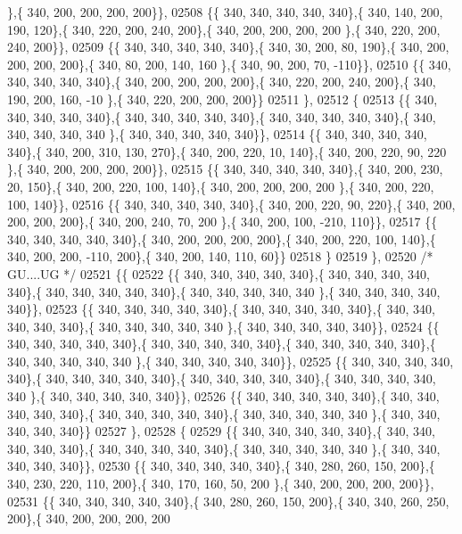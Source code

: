 \begin{DoxyCode}
      \},\{ 340, 200, 200, 200, 200\}\},
02508 \{\{ 340, 340, 340, 340, 340\},\{ 340, 140, 200, 190, 120\},\{ 340, 220, 200, 240, 200\},\{ 340, 200, 200, 200, 200
      \},\{ 340, 220, 200, 240, 200\}\},
02509 \{\{ 340, 340, 340, 340, 340\},\{ 340,  30, 200,  80, 190\},\{ 340, 200, 200, 200, 200\},\{ 340,  80, 200, 140, 160
      \},\{ 340,  90, 200,  70, -110\}\},
02510 \{\{ 340, 340, 340, 340, 340\},\{ 340, 200, 200, 200, 200\},\{ 340, 220, 200, 240, 200\},\{ 340, 190, 200, 160, -10
      \},\{ 340, 220, 200, 200, 200\}\}
02511 \},
02512 \{
02513 \{\{ 340, 340, 340, 340, 340\},\{ 340, 340, 340, 340, 340\},\{ 340, 340, 340, 340, 340\},\{ 340, 340, 340, 340, 340
      \},\{ 340, 340, 340, 340, 340\}\},
02514 \{\{ 340, 340, 340, 340, 340\},\{ 340, 200, 310, 130, 270\},\{ 340, 200, 220,  10, 140\},\{ 340, 200, 220,  90, 220
      \},\{ 340, 200, 200, 200, 200\}\},
02515 \{\{ 340, 340, 340, 340, 340\},\{ 340, 200, 230,  20, 150\},\{ 340, 200, 220, 100, 140\},\{ 340, 200, 200, 200, 200
      \},\{ 340, 200, 220, 100, 140\}\},
02516 \{\{ 340, 340, 340, 340, 340\},\{ 340, 200, 220,  90, 220\},\{ 340, 200, 200, 200, 200\},\{ 340, 200, 240,  70, 200
      \},\{ 340, 200, 100, -210, 110\}\},
02517 \{\{ 340, 340, 340, 340, 340\},\{ 340, 200, 200, 200, 200\},\{ 340, 200, 220, 100, 140\},\{ 340, 200, 200, -110, 
      200\},\{ 340, 200, 140, 110,  60\}\}
02518 \}
02519 \},
02520 \textcolor{comment}{/* GU....UG */}
02521 \{\{
02522 \{\{ 340, 340, 340, 340, 340\},\{ 340, 340, 340, 340, 340\},\{ 340, 340, 340, 340, 340\},\{ 340, 340, 340, 340, 340
      \},\{ 340, 340, 340, 340, 340\}\},
02523 \{\{ 340, 340, 340, 340, 340\},\{ 340, 340, 340, 340, 340\},\{ 340, 340, 340, 340, 340\},\{ 340, 340, 340, 340, 340
      \},\{ 340, 340, 340, 340, 340\}\},
02524 \{\{ 340, 340, 340, 340, 340\},\{ 340, 340, 340, 340, 340\},\{ 340, 340, 340, 340, 340\},\{ 340, 340, 340, 340, 340
      \},\{ 340, 340, 340, 340, 340\}\},
02525 \{\{ 340, 340, 340, 340, 340\},\{ 340, 340, 340, 340, 340\},\{ 340, 340, 340, 340, 340\},\{ 340, 340, 340, 340, 340
      \},\{ 340, 340, 340, 340, 340\}\},
02526 \{\{ 340, 340, 340, 340, 340\},\{ 340, 340, 340, 340, 340\},\{ 340, 340, 340, 340, 340\},\{ 340, 340, 340, 340, 340
      \},\{ 340, 340, 340, 340, 340\}\}
02527 \},
02528 \{
02529 \{\{ 340, 340, 340, 340, 340\},\{ 340, 340, 340, 340, 340\},\{ 340, 340, 340, 340, 340\},\{ 340, 340, 340, 340, 340
      \},\{ 340, 340, 340, 340, 340\}\},
02530 \{\{ 340, 340, 340, 340, 340\},\{ 340, 280, 260, 150, 200\},\{ 340, 230, 220, 110, 200\},\{ 340, 170, 160,  50, 200
      \},\{ 340, 200, 200, 200, 200\}\},
02531 \{\{ 340, 340, 340, 340, 340\},\{ 340, 280, 260, 150, 200\},\{ 340, 340, 260, 250, 200\},\{ 340, 200, 200, 200, 200

\end{DoxyCode}
